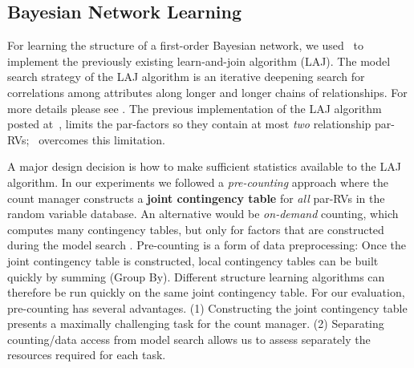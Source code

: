 \documentclass{IEEEtran}
\begin{document}
\subsection{Bayesian Network Learning} 
For learning the structure of a first-order Bayesian network, we used \FB\ to implement the previously existing learn-and-join algorithm (LAJ). 
The model search strategy of the LAJ algorithm is an iterative deepening search for correlations among attributes along longer and longer chains of relationships. For more details please see \cite{Schulte2012}. 
The previous implementation of the LAJ algorithm posted at~\cite{bib:bbsite}, limits the par-factors so they contain at most {\em two} relationship par-RVs; \FB\ overcomes this limitation.

A major design decision is how to make sufficient statistics available to the LAJ algorithm. In our experiments we followed a {\em pre-counting} approach where the count manager constructs a \textbf{joint contingency table} for {\em all} par-RVs in the random variable database. An alternative would be {\em on-demand} counting, which computes many contingency tables, but only for factors that are constructed during the model search \cite{Lv2012}.
Pre-counting is a form of data preprocessing: Once the joint contingency table is constructed, local contingency tables can be built quickly by summing (Group By). Different structure learning algorithms can therefore be run quickly on the same joint contingency table. 
%
For our evaluation, pre-counting has several advantages. (1) Constructing the joint contingency table presents a maximally challenging task for the count manager. (2) Separating counting/data access from model search allows us to assess separately the resources required for each task.
\end{document}
